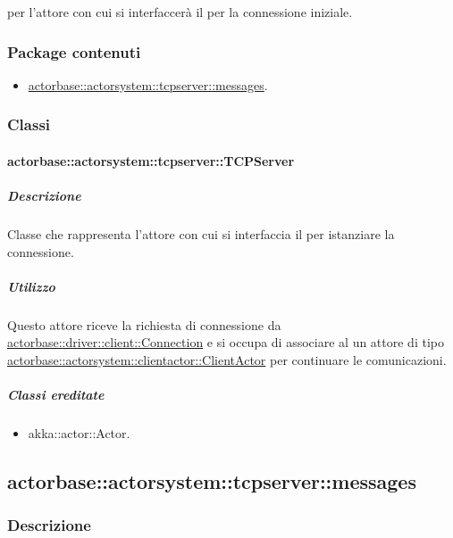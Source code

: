 \documentclass{scalatekids-article}
\begin{document}
 per l'attore con cui si interfaccerà il  per la connessione iniziale.

\subsubsection{Package contenuti}

\begin{itemize}
\item \hyperref[sec:actorbase::actorsystem::tcpserver::messages]{actorbase::actorsystem::tcpserver::messages}.
\end{itemize}

\subsubsection{Classi}

\paragraph{actorbase::actorsystem::tcpserver::TCPServer}
\label{sec:actorbase::actorsystem::tcpserver::TCPServer}

\subparagraph{Descrizione}

Classe che rappresenta l'attore con cui si interfaccia il  per
istanziare la connessione.

\subparagraph{Utilizzo}

Questo attore riceve la richiesta di connessione da
\hyperref[sec:actorbase::driver::client::Connection]{actorbase::driver::client::Connection}
e si occupa di associare al  un attore di tipo
\hyperref[sec:actorbase::actorsystem::clientactor::ClientActor]{actorbase::actorsystem::clientactor::ClientActor}
per continuare le comunicazioni.

\subparagraph{Classi ereditate}

\begin{itemize}

\item akka::actor::Actor.

\end{itemize}

\subsection{actorbase::actorsystem::tcpserver::messages}
\label{sec:actorbase::actorsystem::tcpserver::messages}

\subsubsection{Descrizione}
\end{document}
